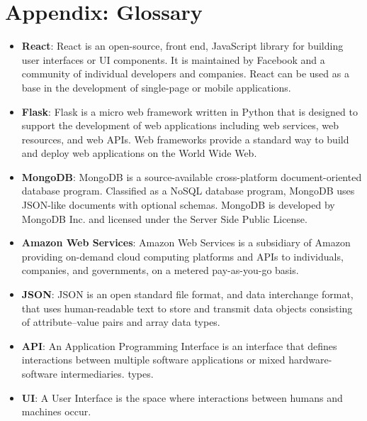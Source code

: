 \documentclass[12pt, a4]{report}
\begin{document}

\newpage
\chapter*{Appendix: Glossary}
\begin{itemize}
    \item \textbf{React}: React is an open-source, front end, JavaScript library for building user interfaces or UI components. It is maintained by Facebook and a community of individual developers and companies. React can be used as a base in the development of single-page or mobile applications.
    \item \textbf{Flask}: Flask is a micro web framework written in Python that is designed to support the development of web applications including web services, web resources, and web APIs. Web frameworks provide a standard way to build and deploy web applications on the World Wide Web.
    \item \textbf{MongoDB}: MongoDB is a source-available cross-platform document-oriented database program. Classified as a NoSQL database program, MongoDB uses JSON-like documents with optional schemas. MongoDB is developed by MongoDB Inc. and licensed under the Server Side Public License.
    \item \textbf{Amazon Web Services}: Amazon Web Services is a subsidiary of Amazon providing on-demand cloud computing platforms and APIs to individuals, companies, and governments, on a metered pay-as-you-go basis.
    \item \textbf{JSON}: JSON is an open standard file format, and data interchange format, that uses human-readable text to store and transmit data objects consisting of attribute–value pairs and array data types.
    \item \textbf{API}: An Application Programming Interface is an interface that defines interactions between multiple software applications or mixed hardware-software intermediaries. types.
    \item \textbf{UI}: A User Interface is the space where interactions between humans and machines occur.
\end{itemize}
\end{document}
